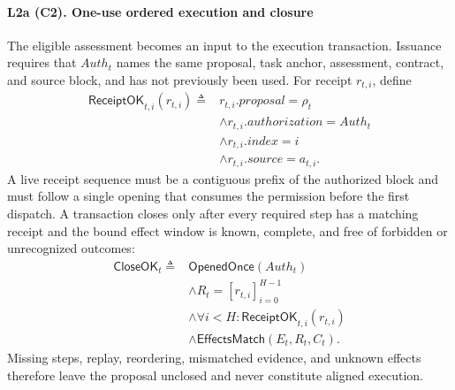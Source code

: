\paragraph{L2a (C2). One-use ordered execution and closure}
The eligible assessment becomes an input to the execution transaction.
Issuance requires that $\mathit{Auth}_t$ names the same proposal, task anchor,
assessment, contract, and source block, and has not previously been used.
For receipt $r_{t,i}$, define
\begin{align}
\mathsf{ReceiptOK}_{t,i}(r_{t,i}) \triangleq{}&
r_{t,i}.\mathit{proposal}=\rho_t \nonumber\\
&\land r_{t,i}.\mathit{authorization}=\mathit{Auth}_t \nonumber\\
&\land r_{t,i}.\mathit{index}=i \nonumber\\
&\land r_{t,i}.\mathit{source}=a_{t,i}.
\label{eq:receipt-ok}
\end{align}
A live receipt sequence must be a contiguous prefix of the authorized block and
must follow a single opening that consumes the permission before the first
dispatch.  A transaction closes only after every required step has a matching
receipt and the bound effect window is known, complete, and free of forbidden or
unrecognized outcomes:
\begin{align}
\mathsf{CloseOK}_t \triangleq{}&
\mathsf{OpenedOnce}(\mathit{Auth}_t) \nonumber\\
&\land R_t=[r_{t,i}]_{i=0}^{H-1} \nonumber\\
&\land\forall i<H:\mathsf{ReceiptOK}_{t,i}(r_{t,i}) \nonumber\\
&\land\mathsf{EffectsMatch}(E_t,R_t,C_t).
\label{eq:close-ok}
\end{align}
Missing steps, replay, reordering, mismatched evidence, and unknown effects
therefore leave the proposal unclosed and never constitute aligned execution.

